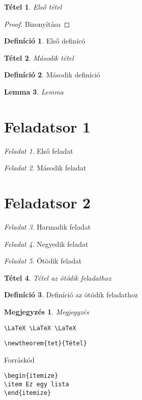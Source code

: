 \documentclass{article}
\newtheorem*{megj}{Megjegyzés}
\theoremstyle{plain}
\newtheorem{tet}{Tétel}
\newtheorem{lem}[tet]{Lemma}
\theoremstyle{definition}
\newtheorem{defi}{Definíció}
\theoremstyle{remark}
\newtheorem{fel}{Feladat}[section]
\begin{document}
\listofalgorithms
\begin{tet}
Első tétel
\end{tet}
\begin{proof}
Bizonyítása
\end{proof}
\begin{defi}
Első definícó
\end{defi}
\begin{tet}
Második tétel
\end{tet}
\begin{defi}
Második definíció
\end{defi}
\begin{lem}
Lemma
\end{lem}
\section{Feladatsor 1}
\begin{fel}
Első feladat
\end{fel}
\begin{fel}
Második feladat
\end{fel}
\section{Feladatsor 2}
\begin{fel}
Harmadik feladat
\end{fel}
\begin{fel}
Negyedik feladat
\end{fel}
\begin{fel}
Ötödik feladat
\end{fel}
\begin{tet}
Tétel az ötödik feladathoz
\end{tet}
\begin{defi}
Definíció az ötödik feladathoz
\end{defi}
\begin{megj}
Megjegyzés
\end{megj}
\verb|\LaTeX \LaTeX \LaTeX|

\verb|\newtheorem{tet}{Tétel}|

\hulipsum[1]
\begin{forraskod}
\caption{Forráskód}
\label{forraskod}
\begin{verbatim}
\begin{itemize}
\item Ez egy lista
\end{itemize}
\end{verbatim}
\end{forraskod}
\newpage

\end{document}
